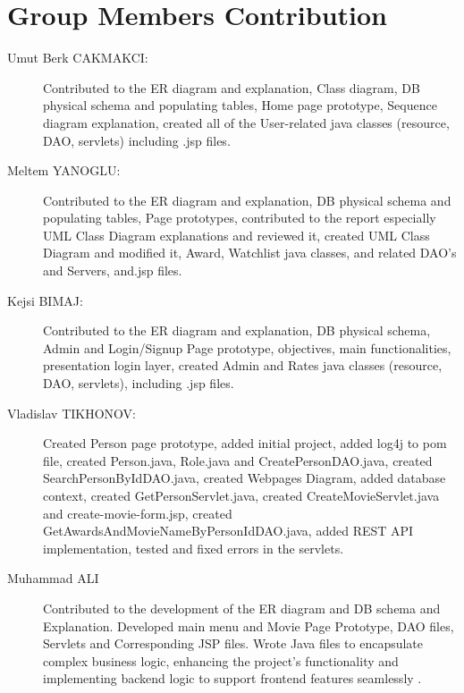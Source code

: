 \section{Group Members Contribution}


\begin{description}
	\item[Umut Berk CAKMAKCI:] Contributed to the ER diagram and explanation, Class diagram, DB physical schema and populating tables, Home page prototype, Sequence diagram explanation, created all of the User-related java classes (resource, DAO, servlets) including .jsp files. 
	\item[Meltem YANOGLU:] Contributed to the ER diagram and explanation, DB physical schema and populating tables, Page prototypes, contributed to the report especially UML Class Diagram explanations and reviewed it, created UML Class Diagram and modified it, Award, Watchlist java classes, and related DAO's and Servers, and.jsp files. 
	\item[Kejsi BIMAJ:] Contributed to the ER diagram and explanation, DB physical schema, Admin and  Login/Signup Page prototype, objectives, main functionalities, presentation login layer, created Admin and Rates java classes (resource, DAO, servlets), including .jsp files.
	\item[Vladislav TIKHONOV:] Created Person page prototype, added initial project, added log4j to pom file, created Person.java, Role.java and CreatePersonDAO.java, created SearchPersonByIdDAO.java, created Webpages Diagram, added database context, created GetPersonServlet.java, created CreateMovieServlet.java and create-movie-form.jsp, created GetAwardsAndMovieNameByPersonIdDAO.java, added REST API implementation, tested and fixed errors in the servlets.
	\item[Muhammad ALI]


Contributed to the development of the ER diagram and DB schema  and Explanation. Developed main menu and Movie Page Prototype, DAO files, Servlets and Corresponding JSP files. Wrote Java files to encapsulate complex business logic, enhancing the project's functionality and  implementing backend logic to support frontend features seamlessly . 

\end{description}
